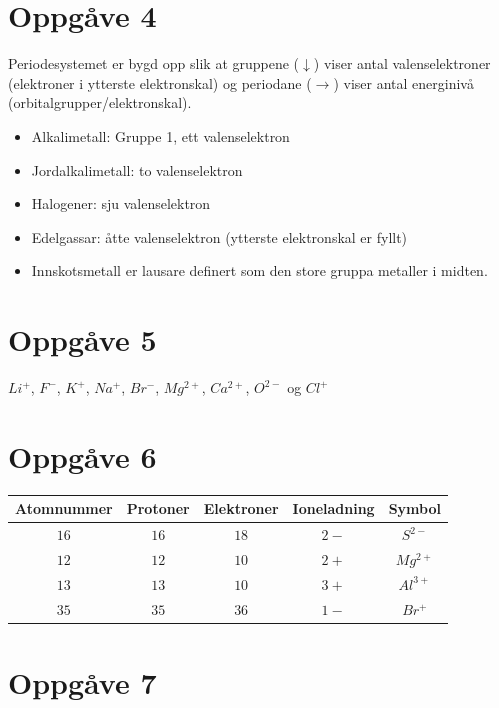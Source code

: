 \documentclass[12pt,a4paper]{article}
\begin{document}
  \section*{Oppgåve 4}
    Periodesystemet er bygd opp slik at gruppene ($\downarrow$) viser antal valenselektroner
    (elektroner i ytterste elektronskal) og periodane ($\rightarrow$) viser antal energinivå
    (orbitalgrupper/elektronskal).
    \begin{itemize}
      \item Alkalimetall: Gruppe 1, ett valenselektron
      \item Jordalkalimetall: to valenselektron
      \item Halogener: sju valenselektron
      \item Edelgassar: åtte valenselektron (ytterste elektronskal er fyllt)
      \item Innskotsmetall er lausare definert som den store gruppa metaller i midten.
    \end{itemize}


  \section*{Oppgåve 5}
    $Li^+$, $F^-$, $K^+$, $Na^+$, $Br^-$, $Mg^{2+}$, $Ca^{2+}$, $O^{2-}$ og $Cl^+$

  \section*{Oppgåve 6}
    \begin{center}
      \begin{tabular}{|c|c|c|c|c|}
        \hline
        Atomnummer & Protoner & Elektroner & Ioneladning & Symbol \\
        \hline
        $16$  &  $16$  &  $18$  &  $2-$  &  $S^{2-}$ \\
        \hline
        $12$  &  $12$  &  $10$  &  $2+$  &  $Mg^{2+}$ \\
        \hline
        $13$  &  $13$  &  $10$  &  $3+$  &  $Al^{3+}$ \\
        \hline
        $35$  &  $35$  &  $36$  &  $1-$  &  $Br^{+}$ \\
        \hline
      \end{tabular}
    \end{center}


  \section*{Oppgåve 7}
\end{document}

